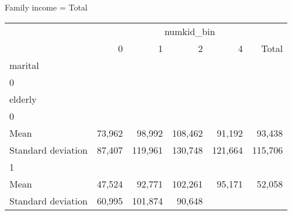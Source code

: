 Family income = Total
\begin{tabular}{llllll}
\cline{1-6}
\multicolumn{1}{c}{} &
  \multicolumn{5}{|c}{numkid\_bin} \\
\multicolumn{1}{c}{} &
  \multicolumn{1}{|r}{0} &
  \multicolumn{1}{r}{1} &
  \multicolumn{1}{r}{2} &
  \multicolumn{1}{r}{4} &
  \multicolumn{1}{r}{Total} \\
\cline{1-6}
\multicolumn{1}{l}{marital} &
  \multicolumn{1}{|r}{} &
  \multicolumn{1}{r}{} &
  \multicolumn{1}{r}{} &
  \multicolumn{1}{r}{} &
  \multicolumn{1}{r}{} \\
\multicolumn{1}{l}{\hspace{1em}0} &
  \multicolumn{1}{|r}{} &
  \multicolumn{1}{r}{} &
  \multicolumn{1}{r}{} &
  \multicolumn{1}{r}{} &
  \multicolumn{1}{r}{} \\
\multicolumn{1}{l}{\hspace{2em}elderly} &
  \multicolumn{1}{|r}{} &
  \multicolumn{1}{r}{} &
  \multicolumn{1}{r}{} &
  \multicolumn{1}{r}{} &
  \multicolumn{1}{r}{} \\
\multicolumn{1}{l}{\hspace{3em}0} &
  \multicolumn{1}{|r}{} &
  \multicolumn{1}{r}{} &
  \multicolumn{1}{r}{} &
  \multicolumn{1}{r}{} &
  \multicolumn{1}{r}{} \\
\multicolumn{1}{l}{\hspace{4em}Mean} &
  \multicolumn{1}{|r}{73,962} &
  \multicolumn{1}{r}{98,992} &
  \multicolumn{1}{r}{108,462} &
  \multicolumn{1}{r}{91,192} &
  \multicolumn{1}{r}{93,438} \\
\multicolumn{1}{l}{\hspace{4em}Standard deviation} &
  \multicolumn{1}{|r}{87,407} &
  \multicolumn{1}{r}{119,961} &
  \multicolumn{1}{r}{130,748} &
  \multicolumn{1}{r}{121,664} &
  \multicolumn{1}{r}{115,706} \\
\multicolumn{1}{l}{\hspace{3em}1} &
  \multicolumn{1}{|r}{} &
  \multicolumn{1}{r}{} &
  \multicolumn{1}{r}{} &
  \multicolumn{1}{r}{} &
  \multicolumn{1}{r}{} \\
\multicolumn{1}{l}{\hspace{4em}Mean} &
  \multicolumn{1}{|r}{47,524} &
  \multicolumn{1}{r}{92,771} &
  \multicolumn{1}{r}{102,261} &
  \multicolumn{1}{r}{95,171} &
  \multicolumn{1}{r}{52,058} \\
\multicolumn{1}{l}{\hspace{4em}Standard deviation} &
  \multicolumn{1}{|r}{60,995} &
  \multicolumn{1}{r}{101,874} &
  \multicolumn{1}{r}{90,648} &

\end{tabular}
